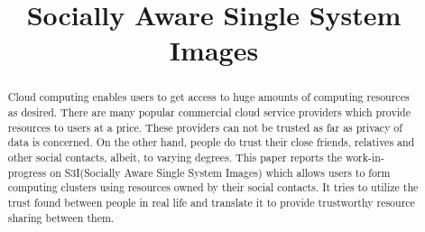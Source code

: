 \documentclass[10pt, conference, compsocconf]{IEEEtran}
\begin{document}
%
\title{Socially Aware Single System Images}



\author{
\and
{}
\and
{}
}

\maketitle


\begin{abstract}
Cloud computing enables users to get access to huge amounts 
of computing resources as desired. There are many popular
commercial cloud service providers which provide resources
to users at a price. These providers can not be trusted as
far as privacy of data is concerned. On the other hand,
people do trust their close friends, relatives and other
social contacts, albeit, to varying degrees. This paper
reports the work-in-progress on S3I(Socially Aware
Single System Images) which allows users to form computing
clusters using resources owned by their social contacts.
It tries to utilize the trust found between people in real
life and translate it to provide trustworthy resource
sharing between them.

\end{abstract}


\end{document}
